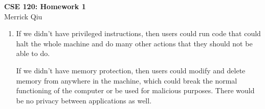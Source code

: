 \documentclass{article}
\begin{document}
\begin{center}
	\huge{\bf CSE 120: Homework 1} \\
	Merrick Qiu
\end{center}

\begin{enumerate}
    \item If we didn't have privileged instructions, then users could run code that could halt the whole machine
    and do many other actions that they should not be able to do. 

    If we didn't have memory protection, then users could modify and delete memory from anywhere in the machine,
    which could break the normal functioning of the computer or be used for malicious purposes.
    There would be no privacy between applications as well.


\end{enumerate}
\end{document}
